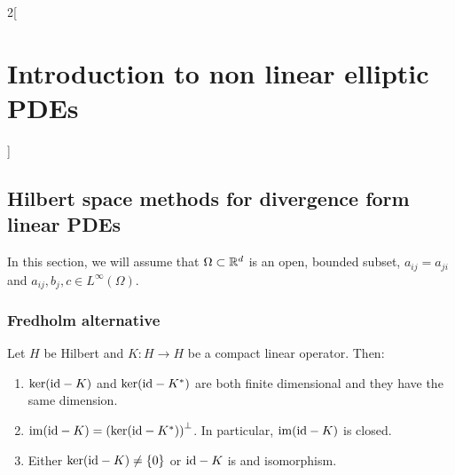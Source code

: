\documentclass[../../../main_math.tex]{subfiles}
\begin{document}
\begin{multicols}{2}[\section{Introduction to non linear elliptic PDEs}]
  \subsection{Hilbert space methods for divergence form linear PDEs}
  In this section, we will assume that $\Omega\subset\mathbb{R}^d$ is an open, bounded subset, $a_{ij}=a_{ji}$ and $a_{ij},b_j,c\in L^\infty(\Omega)$.
  \subsubsection{Fredholm alternative}
  \begin{theorem}
    Let $H$ be Hilbert and $K:H\to H$ be a compact linear operator. Then:
    \begin{enumerate}
      \item $\ker(\mathrm{id}-K)$ and $\ker(\mathrm{id}-K^*)$ are both finite dimensional and they have the same dimension.
      \item $\operatorname{im}(\mathrm{id}-K)={(\ker(\mathrm{id}-K^*))}^\perp$. In particular, $\operatorname{im}(\mathrm{id}-K)$ is closed.
      \item Either $\ker(\mathrm{id}-K)\ne\{0\}$ or $\mathrm{id} -K$ is and isomorphism.
    \end{enumerate}
  \end{theorem}
\end{multicols}
\end{document}
